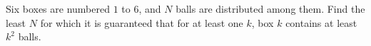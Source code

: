 Six boxes are numbered $1$ to $6$, and $N$ balls are distributed among them. Find the least $N$ for which it is guaranteed that for at least one $k$, box $k$ contains at least $k^2$ balls.
